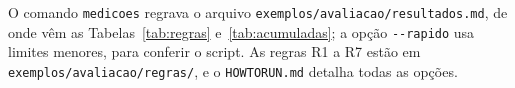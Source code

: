 \documentclass[11pt,a4paper]{article}
\begin{document}
O comando \texttt{medicoes} regrava o arquivo \texttt{exemplos/avaliacao/resultados.md}, de onde vêm as Tabelas~\ref{tab:regras} e~\ref{tab:acumuladas}; a opção \texttt{-{}-rapido} usa limites menores, para conferir o script. As regras R1 a R7 estão em \texttt{exemplos/avaliacao/regras/}, e o \texttt{HOWTORUN.md} detalha todas as opções.
\end{document}
